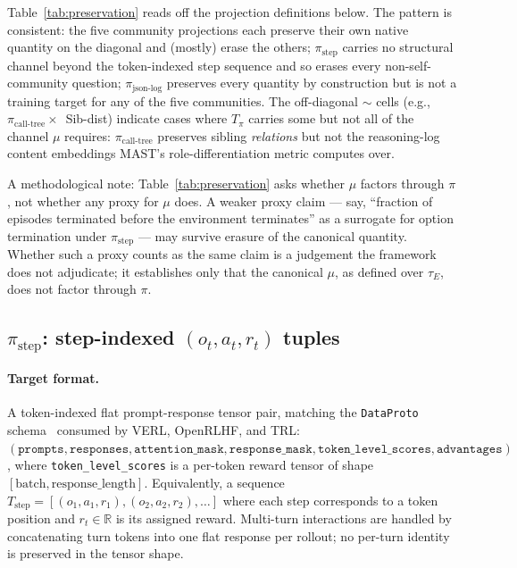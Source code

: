\documentclass{article}
\begin{document}
Table~\ref{tab:preservation} reads off the projection definitions
below. The pattern is consistent: the five community projections
each preserve their own native quantity on the diagonal and
(mostly) erase the others; $\pi_{\text{step}}$ carries no
structural channel beyond the token-indexed step sequence and so
erases every non-self-community question;
$\pi_{\text{json-log}}$ preserves every quantity by construction
but is not a training target for any of the five communities.
The off-diagonal $\sim$ cells (e.g.,
$\pi_{\text{call-tree}} \times$~Sib-dist) indicate cases where
$T_\pi$ carries some but not all of the channel $\mu$ requires:
$\pi_{\text{call-tree}}$ preserves sibling \emph{relations} but
not the reasoning-log content embeddings MAST's role-differentiation
metric computes over.

A methodological note: Table~\ref{tab:preservation} asks whether
$\mu$ factors through $\pi$, not whether any proxy for $\mu$
does. A weaker proxy claim --- say, ``fraction of episodes
terminated before the environment terminates'' as a surrogate for
option termination under $\pi_{\text{step}}$ --- may survive
erasure of the canonical quantity. Whether such a proxy counts
as the same claim is a judgement the framework does not
adjudicate; it establishes only that the canonical $\mu$, as
defined over $\tau_E$, does not factor through $\pi$.

\subsection{$\pi_{\text{step}}$: step-indexed $(o_t, a_t, r_t)$ tuples}
\label{app:proj:step}

\paragraph{Target format.} A token-indexed flat prompt-response
tensor pair, matching the \texttt{DataProto}
schema~\citep{sheng2024hybridflow} consumed by VERL, OpenRLHF,
and TRL: $(\texttt{prompts}, \texttt{responses},
\texttt{attention\_mask}, \texttt{response\_mask},
\texttt{token\_level\_scores}, \texttt{advantages})$, where
\texttt{token\_level\_scores} is a per-token reward tensor of
shape $[\text{batch}, \text{response\_length}]$. Equivalently, a
sequence $T_{\text{step}} = [(o_1, a_1, r_1), (o_2, a_2, r_2),
\ldots]$ where each step corresponds to a token position and
$r_t \in \mathbb{R}$ is its assigned reward. Multi-turn
interactions are handled by concatenating turn tokens into one
flat response per rollout; no per-turn identity is preserved in
the tensor shape.
\end{document}
